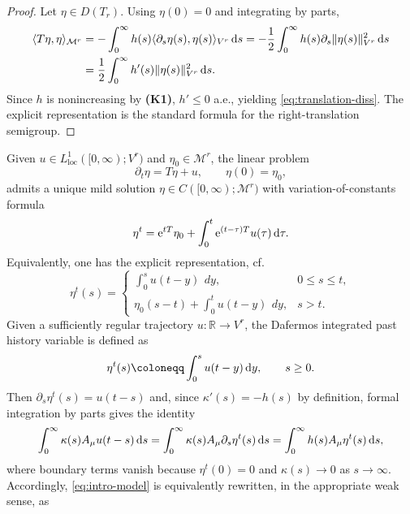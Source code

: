 \documentclass[12pt,leqno]{amsart}
\def\e{{\rm e}}
\def\d{{\rm d}}
\def\loc {{\mathrm{loc}}}
\def\pt {{\partial_t}}
\def \ps {\partial_s}
\theoremstyle{definition}
\numberwithin{equation}{section}
\numberwithin{figure}{section}
\begin{document}
\begin{proof}
Let $\eta\in D(T_r)$. Using $\eta(0)=0$ and integrating by parts,
\[
\begin{split}
\langle T\eta,\eta\rangle_{{\mathcal M^{r}}}
&=-\int_{0}^{\infty}h(s)\langle\ps\eta(s),\eta(s)\rangle_{{V^r}}\,\d s
=-\frac12\int_{0}^{\infty}h(s)\ps\|\eta(s)\|_{{V^r}}^{2}\,\d s \\ &
=\frac12\int_{0}^{\infty}h'(s)\|\eta(s)\|_{{V^r}}^{2}\,\d s.
\end{split}
\]
Since $h$ is nonincreasing by \textbf{(K1)}, $h'\le 0$ a.e., yielding \eqref{eq:translation-diss}.
The explicit representation is the standard formula for the right-translation semigroup.
\end{proof}
Given $u\in L^{1}_{\loc}([0,\infty);{V^r})$ and $\eta_{0}\in{\mathcal M^{r}}$, the linear problem
\[
\pt\eta=T\eta+u,\qquad \eta(0)=\eta_{0},
\]
admits a unique mild solution $\eta\in C([0,\infty);{\mathcal M^{r}})$ with variation-of-constants
formula
\begin{equation}\label{eq:VOC-history}
\eta^{t}=\e^{tT}\eta_{0}+\int_{0}^{t}\e^{(t-\tau)T}u(\tau)\,\d\tau.
\end{equation}
Equivalently, one has the explicit representation, cf.\ \cite[(3.3)]{CGDP2010} 
\begin{equation}\label{eq:eta-representation}
\eta^{t}(s)=
\begin{cases}
\displaystyle\int_{0}^{s}u(t-y)\,\ dy, & 0\le s\le t,\\[2mm]
\eta_{0}(s-t)+\displaystyle\int_{0}^{t}u(t-y)\,\ dy, & s>t.
\end{cases}
\end{equation}
Given a sufficiently regular trajectory $u:\mathbb R \to V^r $, the Dafermos integrated  past history variable is defined  as
\begin{equation}\label{eq:dafermos-variable}
\eta^{t}(s)\coloneqq\int_{0}^{s}u(t-y)\,\d y,\qquad s\ge0.
\end{equation}
Then $\ps\eta^{t}(s)=u(t-s)$ and, since $\kappa'(s)=-h(s)$ by definition, formal
integration by parts gives the identity
\begin{equation}\label{eq:memory-ibp}
\int_{0}^{\infty}\kappa(s)A_{\mu}u(t-s)\,\d s
=\int_{0}^{\infty}\kappa(s)A_{\mu}\ps\eta^{t}(s)\,\d s
=\int_{0}^{\infty}h(s)A_{\mu}\eta^{t}(s)\,\d s,
\end{equation}
where boundary terms vanish because $\eta^{t}(0)=0$ and $\kappa(s)\to0$ as $s\to\infty$.
Accordingly, \eqref{eq:intro-model} is equivalently rewritten, in the appropriate weak sense, as
\end{document}
